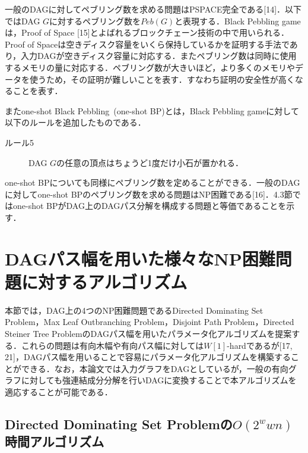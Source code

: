 \documentclass[master]{kuisthesis}		%
\theoremstyle{plain}
\theoremstyle{definition}
\begin{document}
一般のDAGに対してペブリング数を求める問題はPSPACE完全である[14]．以下ではDAG $G$に対するペブリング数を$Peb(G)$と表現する．Black Pebbling gameは，Proof of Space [15]とよばれるブロックチェーン技術の中で用いられる．Proof of Spaceは空きディスク容量をいくら保持しているかを証明する手法であり，入力DAGが空きディスク容量に対応する．またペブリング数は同時に使用するメモリの量に対応する．ペブリング数が大きいほど，より多くのメモリやデータを使うため，その証明が難しいことを表す．すなわち証明の安全性が高くなることを表す．

またone-shot Black Pebbling\ (one-shot BP)とは，Black Pebbling gameに対して以下のルールを追加したものである．
\begin{description}
    \item[ルール5] DAG $G$の任意の頂点はちょうど1度だけ小石が置かれる．
\end{description}

one-shot BPについても同様にペブリング数を定めることができる．一般のDAGに対してone-shot BPのペブリング数を求める問題はNP困難である[16]．4.3節ではone-shot BPがDAG上のDAGパス分解を構成する問題と等価であることを示す．




















\section{DAGパス幅を用いた様々なNP困難問題に対するアルゴリズム} %
本節では，DAG上の4つのNP困難問題であるDirected Dominating Set Problem，Max Leaf Outbranching Problem，Disjoint Path Problem，Directed Steiner Tree ProblemのDAGパス幅を用いたパラメータ化アルゴリズムを提案する．これらの問題は有向木幅や有向パス幅に対しては$W[1]$-hardであるが[17, 21]，DAGパス幅を用いることで容易にパラメータ化アルゴリズムを構築することができる．なお，本論文では入力グラフをDAGとしているが，一般の有向グラフに対しても強連結成分分解を行いDAGに変換することで本アルゴリズムを適応することが可能である．










\subsection{Directed Dominating Set Problemの$O(2^wwn)$時間アルゴリズム}\label{3.1}
\end{document}
